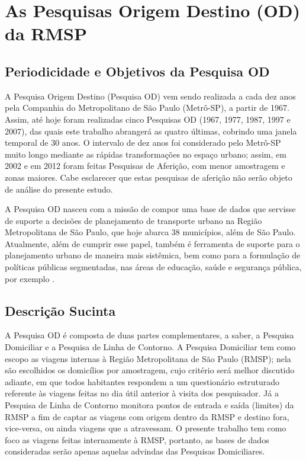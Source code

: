 \chapter{As Pesquisas Origem Destino (OD) da RMSP}\label{chap:pesquisa-od}

\section{Periodicidade e Objetivos da Pesquisa OD}\label{sec:period-obj}

A Pesquisa Origem Destino (Pesquisa OD) vem sendo realizada a cada dez anos pela Companhia do Metropolitano de São Paulo (Metrô-SP), a partir de 1967. Assim, até hoje foram realizadas cinco Pesquisas OD (1967, 1977, 1987, 1997 e 2007), das quais este trabalho abrangerá as quatro últimas, cobrindo uma janela temporal de 30 anos. O intervalo de dez anos foi considerado pelo Metrô-SP muito longo mediante as rápidas transformações no espaço urbano; assim, em 2002 e em 2012 foram feitas Pesquisas de Aferição, com menor amostragem e zonas maiores. Cabe esclarecer que estas pesquisas de aferição não serão objeto de análise do presente estudo.

A Pesquisa OD nasceu com a missão de compor uma base de dados que servisse de suporte a decisões de planejamento de transporte urbano na Região Metropolitana de São Paulo, que hoje abarca 38 municípios, além de São Paulo. Atualmente, além de cumprir esse papel, também é ferramenta de suporte para o planejamento urbano de maneira mais sistêmica, bem como para a formulação de políticas públicas segmentadas, nas áreas de educação, saúde e segurança pública, por exemplo \cite{MANUALOD2007}.

\section{Descrição Sucinta}\label{sec:descr}

A Pesquisa OD é composta de duas partes complementares, a saber, a Pesquisa Domiciliar e a Pesquisa de Linha de Contorno. A Pesquisa Domiciliar tem como escopo as viagens internas à Região Metropolitana de São Paulo (RMSP); nela são escolhidos os domicílios por amostragem, cujo critério será melhor discutido adiante, em que todos habitantes respondem a um questionário estruturado referente às viagens feitas no dia útil anterior à visita dos pesquisador. Já a Pesquisa de Linha de Contorno monitora pontos de entrada e saída (limites) da RMSP a fim de captar as viagens com origem dentro da RMSP e destino fora, vice-versa, ou ainda viagens que a atravessam. O presente trabalho tem como foco as viagens feitas internamente à RMSP, portanto, as bases de dados consideradas serão apenas aquelas advindas das Pesquisas Domiciliares.

